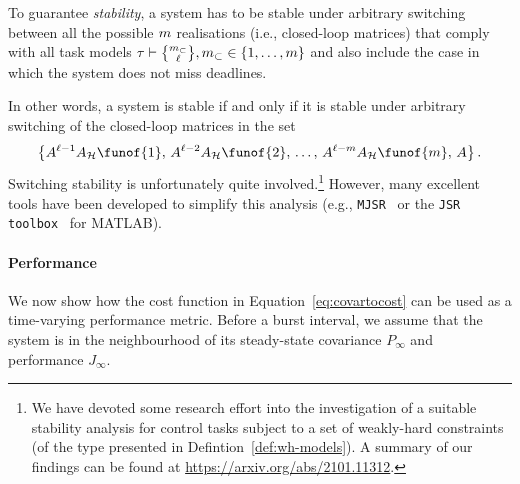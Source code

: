 \begin{definition}%
    To guarantee \emph{\switchingstability{} stability}, a system has to be stable under arbitrary switching between all the possible $m$ realisations (i.e., closed-loop matrices) that comply with all task models $\tau \vdash \genfrac{\{}{\}}{0pt}{}{\nummisses_\subset}{\numtotalanalysed}, \nummisses_\subset \in \{1, \dots,\nummisses\}$ and also include the case in which the system does not miss deadlines.
\end{definition}
In other words, a system is \switchingstability{} stable if and only if it is stable under arbitrary switching of the closed-loop matrices in the set
%
\begin{equation}
    \left\{ A^{\numtotalanalysed-1}A_\strat\funof{1},\, A^{\numtotalanalysed-2}A_\strat\funof{2},\, \ldots,\, A^{\numtotalanalysed-\nummisses}A_\strat\funof{\nummisses},\, A \right\}.
\end{equation}
%
Switching stability is unfortunately quite involved.\footnote{We have devoted some research effort into the investigation of a suitable stability analysis for control tasks subject to a set of weakly-hard constraints (of the type presented in Defintion~\ref{def:wh-models}). A summary of our findings can be found at \url{https://arxiv.org/abs/2101.11312}.}
However, many excellent tools have been developed to simplify this analysis (e.g., \texttt{MJSR}~\cite{Maggio:2020} or the \texttt{JSR toolbox}~\cite{Jungers:2014} for MATLAB).

\paragraph*{Performance}%

We now show how the cost function in Equation~\eqref{eq:covartocost} can be used as a time-varying performance metric.
Before a burst interval, we assume that the system is in the neighbourhood of its steady-state covariance $P_\infty$ and performance $J_\infty$.


